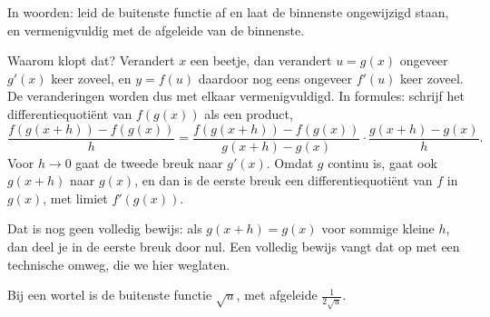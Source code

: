 In woorden: leid de buitenste functie af en laat de binnenste ongewijzigd staan, en vermenigvuldig met de afgeleide van de binnenste.

Waarom klopt dat? Verandert $x$ een beetje, dan verandert $u = g(x)$ ongeveer $g'(x)$ keer zoveel, en $y = f(u)$ daardoor nog eens ongeveer $f'(u)$ keer zoveel. De veranderingen worden dus met elkaar vermenigvuldigd. In formules: schrijf het differentiequotiënt van $f(g(x))$ als een product,
\[\frac{f(g(x + h)) - f(g(x))}{h} = \frac{f(g(x + h)) - f(g(x))}{g(x + h) - g(x)} \cdot \frac{g(x + h) - g(x)}{h} .\]
Voor $h \to 0$ gaat de tweede breuk naar $g'(x)$. Omdat $g$ continu is, gaat ook $g(x + h)$ naar $g(x)$, en dan is de eerste breuk een differentiequotiënt van $f$ in $g(x)$, met limiet $f'(g(x))$.

Dat is nog geen volledig bewijs: als $g(x + h) = g(x)$ voor sommige kleine $h$, dan deel je in de eerste breuk door nul. Een volledig bewijs vangt dat op met een technische omweg, die we hier weglaten.


\begin{oefeningen}
\end{oefeningen}

Bij een wortel is de buitenste functie $\sqrt u$, met afgeleide $\frac{1}{2\sqrt u}$.


